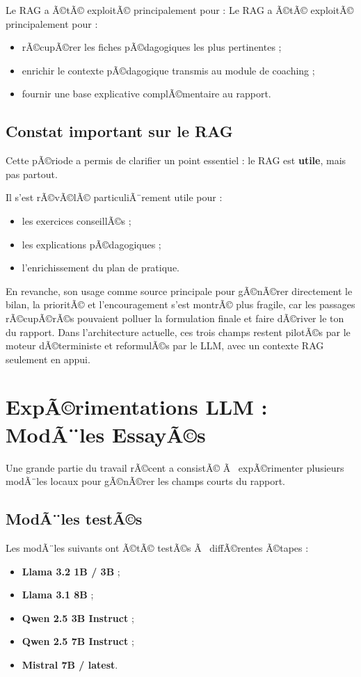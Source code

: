 ﻿\documentclass[12pt,a4paper]{article}
\begin{document}
Le RAG a Ã©tÃ© exploitÃ© principalement pour :
Le RAG a Ã©tÃ© exploitÃ© principalement pour :
\begin{itemize}
    \item rÃ©cupÃ©rer les fiches pÃ©dagogiques les plus pertinentes ;
    \item enrichir le contexte pÃ©dagogique transmis au module de coaching ;
    \item fournir une base explicative complÃ©mentaire au rapport.
\end{itemize}
\subsection{Constat important sur le RAG}
Cette pÃ©riode a permis de clarifier un point essentiel : le RAG est \textbf{utile}, mais pas partout.

Il s'est rÃ©vÃ©lÃ© particuliÃ¨rement utile pour :
\begin{itemize}
    \item les exercices conseillÃ©s ;
    \item les explications pÃ©dagogiques ;
    \item l'enrichissement du plan de pratique.
\end{itemize}

En revanche, son usage comme source principale pour gÃ©nÃ©rer directement le bilan, la prioritÃ© et l'encouragement s'est montrÃ© plus fragile, car les passages rÃ©cupÃ©rÃ©s pouvaient polluer la formulation finale et faire dÃ©river le ton du rapport. Dans l'architecture actuelle, ces trois champs restent pilotÃ©s par le moteur dÃ©terministe et reformulÃ©s par le LLM, avec un contexte RAG seulement en appui.

\section{ExpÃ©rimentations LLM : ModÃ¨les EssayÃ©s}
Une grande partie du travail rÃ©cent a consistÃ© Ã  expÃ©rimenter plusieurs modÃ¨les locaux pour gÃ©nÃ©rer les champs courts du rapport.

\subsection{ModÃ¨les testÃ©s}
Les modÃ¨les suivants ont Ã©tÃ© testÃ©s Ã  diffÃ©rentes Ã©tapes :
\begin{itemize}
    \item \textbf{Llama 3.2 1B / 3B} ;
    \item \textbf{Llama 3.1 8B} ;
    \item \textbf{Qwen 2.5 3B Instruct} ;
    \item \textbf{Qwen 2.5 7B Instruct} ;
    \item \textbf{Mistral 7B / latest}.
\end{itemize}
\end{document}
